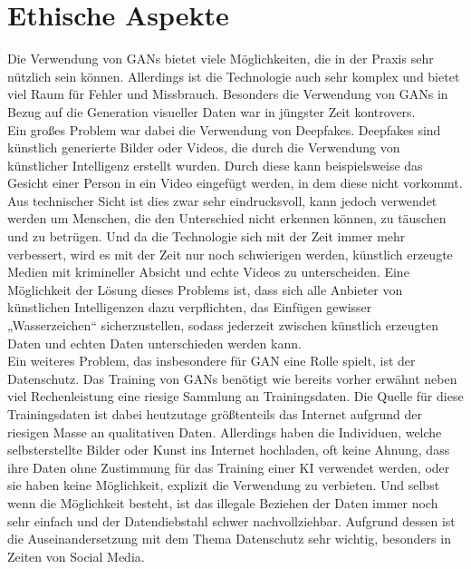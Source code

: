 \section{Ethische Aspekte}

\noindent Die Verwendung von \acp{GAN} bietet viele Möglichkeiten, die in der Praxis sehr nützlich sein können. Allerdings ist die Technologie auch sehr komplex und bietet viel Raum für Fehler und Missbrauch. Besonders die Verwendung von \acp{GAN} in Bezug auf die Generation visueller Daten war in jüngster Zeit kontrovers. \\

\noindent Ein großes Problem war dabei die Verwendung von Deepfakes. Deepfakes sind künstlich generierte Bilder oder Videos, die durch die Verwendung von künstlicher Intelligenz erstellt wurden. Durch diese kann beispielsweise das Gesicht einer Person in ein Video eingefügt werden, in dem diese nicht vorkommt. Aus technischer Sicht ist dies zwar sehr eindrucksvoll, kann jedoch verwendet werden um Menschen, die den Unterschied nicht erkennen können, zu täuschen und zu betrügen. Und da die Technologie sich mit der Zeit immer mehr verbessert, wird es mit der Zeit nur noch schwierigen werden, künstlich erzeugte Medien mit krimineller Absicht und echte Videos zu unterscheiden. Eine Möglichkeit der Lösung dieses Problems ist, dass sich alle Anbieter von künstlichen Intelligenzen dazu verpflichten, das Einfügen gewisser „Wasserzeichen“ sicherzustellen, sodass jederzeit zwischen künstlich erzeugten Daten und echten Daten unterschieden werden kann.\\

\noindent Ein weiteres Problem, das insbesondere für \ac{GAN} eine Rolle spielt, ist der Datenschutz. Das Training von \acp{GAN} benötigt wie bereits vorher erwähnt neben viel Rechenleistung eine riesige Sammlung an Trainingsdaten. Die Quelle für diese Trainingsdaten ist dabei heutzutage größtenteils das Internet aufgrund der riesigen Masse an qualitativen Daten. Allerdings haben die Individuen, welche selbsterstellte Bilder oder Kunst ins Internet hochladen, oft keine Ahnung, dass ihre Daten ohne Zustimmung für das Training einer KI verwendet werden, oder sie haben keine Möglichkeit, explizit die Verwendung zu verbieten. Und selbst wenn die Möglichkeit besteht, ist das illegale Beziehen der Daten immer noch sehr einfach und der Datendiebstahl schwer nachvollziehbar. Aufgrund dessen ist die Auseinandersetzung mit dem Thema Datenschutz sehr wichtig, besonders in Zeiten von Social Media. \\

\newpage
